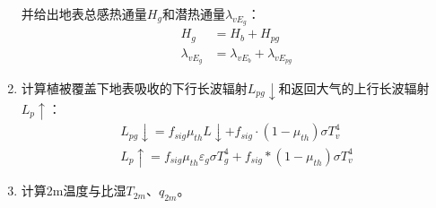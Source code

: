 \begin{enumerate}
    并给出地表总感热通量$H_g$和潜热通量$\lambda_{vE_g}$：
    \begin{equation}
    \begin{aligned} H_{g} &=H_{b}+H_{p g} \\ \lambda_{vE_{g}} &=\lambda_{vE_{b}}+\lambda_{vE_{pg}} \end{aligned}
    \end{equation}
    \item 计算植被覆盖下地表吸收的下行长波辐射$L_{pg}\downarrow$和返回大气的上行长波辐射$L_p\uparrow$：
    \begin{equation}
    \begin{array}{c}L_{pg} \downarrow=f_{sig} \mu_{th} L \downarrow+f_{sig} \cdot \left(1-\mu_{t h}\right) \sigma T_{v}^{4} \\
         L_{p} \uparrow=f_{sig} \mu_{t h} \varepsilon_{g} \sigma T_{g}^{4}+f_{sig} *\left(1-\mu_{t h}\right) \sigma T_{v}^{4}\end{array}
    \end{equation}
    \item 计算2m温度与比湿$T_{2m}$、$q_{2m}$。
\end{enumerate}
